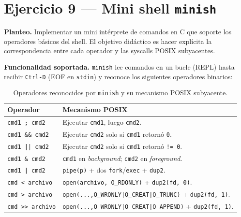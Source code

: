\documentclass[11pt,a4paper]{article}
\begin{document}
\section{Ejercicio 9 --- Mini shell \texttt{minish}}

\textbf{Planteo.} Implementar un mini intérprete de comandos en C que
soporte los operadores básicos del shell. El objetivo didáctico es
hacer explícita la correspondencia entre cada operador y las syscalls
POSIX subyacentes.

\textbf{Funcionalidad soportada.} \texttt{minish} lee comandos en un
bucle (REPL) hasta recibir \texttt{Ctrl-D} (EOF en \texttt{stdin}) y
reconoce los siguientes operadores binarios:

\begin{table}[h]
\centering
\small
\begin{tabular}{l l}
\toprule
\textbf{Operador} & \textbf{Mecanismo POSIX} \\
\midrule
\texttt{cmd1 ; cmd2}     & Ejecutar \texttt{cmd1}, luego \texttt{cmd2}. \\
\texttt{cmd1 \&\& cmd2}  & Ejecutar \texttt{cmd2} solo si \texttt{cmd1} retornó \texttt{0}. \\
\texttt{cmd1 || cmd2}    & Ejecutar \texttt{cmd2} solo si \texttt{cmd1} retornó \texttt{!= 0}. \\
\texttt{cmd1 \& cmd2}    & \texttt{cmd1} en \emph{background}; \texttt{cmd2} en \emph{foreground}. \\
\texttt{cmd1 | cmd2}     & \texttt{pipe(p)} + dos \texttt{fork}/\texttt{exec} + \texttt{dup2}. \\
\texttt{cmd < archivo}   & \texttt{open(archivo, O\_RDONLY)} + \texttt{dup2(fd, 0)}. \\
\texttt{cmd > archivo}   & \texttt{open(...,O\_WRONLY|O\_CREAT|O\_TRUNC)} + \texttt{dup2(fd, 1)}. \\
\texttt{cmd >> archivo}  & \texttt{open(...,O\_WRONLY|O\_CREAT|O\_APPEND)} + \texttt{dup2(fd, 1)}. \\
\bottomrule
\end{tabular}
\caption{Operadores reconocidos por \texttt{minish} y su mecanismo
POSIX subyacente.}
\end{table}
\end{document}
